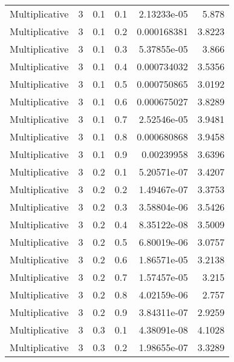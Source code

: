 \documentclass{article}
\begin{document}
\begin{longtable}[H]{lrrrrr}
 Multiplicative &       3 &   0.1 &            0.1 &      2.13233e-05 &          5.878  \\
 Multiplicative &       3 &   0.1 &            0.2 &      0.000168381 &          3.8223 \\
 Multiplicative &       3 &   0.1 &            0.3 &      5.37855e-05 &          3.866  \\
 Multiplicative &       3 &   0.1 &            0.4 &      0.000734032 &          3.5356 \\
 Multiplicative &       3 &   0.1 &            0.5 &      0.000750865 &          3.0192 \\
 Multiplicative &       3 &   0.1 &            0.6 &      0.000675027 &          3.8289 \\
 Multiplicative &       3 &   0.1 &            0.7 &      2.52546e-05 &          3.9481 \\
 Multiplicative &       3 &   0.1 &            0.8 &      0.000680868 &          3.9458 \\
 Multiplicative &       3 &   0.1 &            0.9 &      0.00239958  &          3.6396 \\
 Multiplicative &       3 &   0.2 &            0.1 &      5.20571e-07 &          3.4207 \\
 Multiplicative &       3 &   0.2 &            0.2 &      1.49467e-07 &          3.3753 \\
 Multiplicative &       3 &   0.2 &            0.3 &      3.58804e-06 &          3.5426 \\
 Multiplicative &       3 &   0.2 &            0.4 &      8.35122e-08 &          3.5009 \\
 Multiplicative &       3 &   0.2 &            0.5 &      6.80019e-06 &          3.0757 \\
 Multiplicative &       3 &   0.2 &            0.6 &      1.86571e-05 &          3.2138 \\
 Multiplicative &       3 &   0.2 &            0.7 &      1.57457e-05 &          3.215  \\
 Multiplicative &       3 &   0.2 &            0.8 &      4.02159e-06 &          2.757  \\
 Multiplicative &       3 &   0.2 &            0.9 &      3.84311e-07 &          2.9259 \\
 Multiplicative &       3 &   0.3 &            0.1 &      4.38091e-08 &          4.1028 \\
 Multiplicative &       3 &   0.3 &            0.2 &      1.98655e-07 &          3.3289 \\

\end{longtable}
\end{document}
